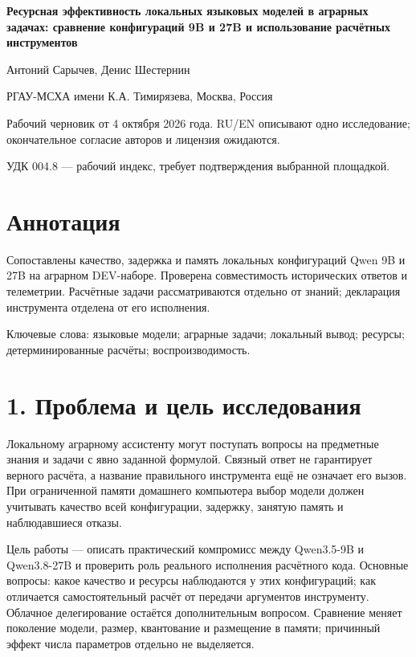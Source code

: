 \documentclass[14pt,a4paper]{extarticle}
\begin{document}
\begin{center}\bfseries Ресурсная эффективность локальных языковых моделей в аграрных задачах: сравнение конфигураций 9B и 27B и использование расчётных инструментов\end{center}

Антоний Сарычев, Денис Шестернин


РГАУ-МСХА имени К.А. Тимирязева, Москва, Россия


Рабочий черновик от 4 октября 2026 года. RU/EN описывают одно исследование; окончательное согласие авторов и лицензия ожидаются.


УДК 004.8 --- рабочий индекс, требует подтверждения выбранной площадкой.


\section*{Аннотация}

Сопоставлены качество, задержка и память локальных конфигураций Qwen 9B и 27B на аграрном DEV-наборе. Проверена совместимость исторических ответов и телеметрии. Расчётные задачи рассматриваются отдельно от знаний; декларация инструмента отделена от его исполнения.


Ключевые слова: языковые модели; аграрные задачи; локальный вывод; ресурсы; детерминированные расчёты; воспроизводимость.


\section*{1. Проблема и цель исследования}

Локальному аграрному ассистенту могут поступать вопросы на предметные знания и задачи с явно заданной формулой. Связный ответ не гарантирует верного расчёта, а название правильного инструмента ещё не означает его вызов. При ограниченной памяти домашнего компьютера выбор модели должен учитывать качество всей конфигурации, задержку, занятую память и наблюдавшиеся отказы.


Цель работы --- описать практический компромисс между Qwen3.5-9B и Qwen3.8-27B и проверить роль реального исполнения расчётного кода. Основные вопросы: какое качество и ресурсы наблюдаются у этих конфигураций; как отличается самостоятельный расчёт от передачи аргументов инструменту. Облачное делегирование остаётся дополнительным вопросом. Сравнение меняет поколение модели, размер, квантование и размещение в памяти; причинный эффект числа параметров отдельно не выделяется.
\end{document}
